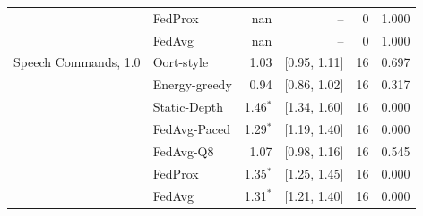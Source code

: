 \begin{tabular}{@{}llrrrr@{}}
 & FedProx & nan & -- & 0 & 1.000\\
 & FedAvg & nan & -- & 0 & 1.000\\
\midrule
Speech Commands, 1.0 & Oort-style & 1.03 & [0.95, 1.11] & 16 & 0.697\\
 & Energy-greedy & 0.94 & [0.86, 1.02] & 16 & 0.317\\
 & Static-Depth & 1.46$^{*}$ & [1.34, 1.60] & 16 & 0.000\\
 & FedAvg-Paced & 1.29$^{*}$ & [1.19, 1.40] & 16 & 0.000\\
 & FedAvg-Q8 & 1.07 & [0.98, 1.16] & 16 & 0.545\\
 & FedProx & 1.35$^{*}$ & [1.25, 1.45] & 16 & 0.000\\
 & FedAvg & 1.31$^{*}$ & [1.21, 1.40] & 16 & 0.000\\
\bottomrule
\end{tabular}